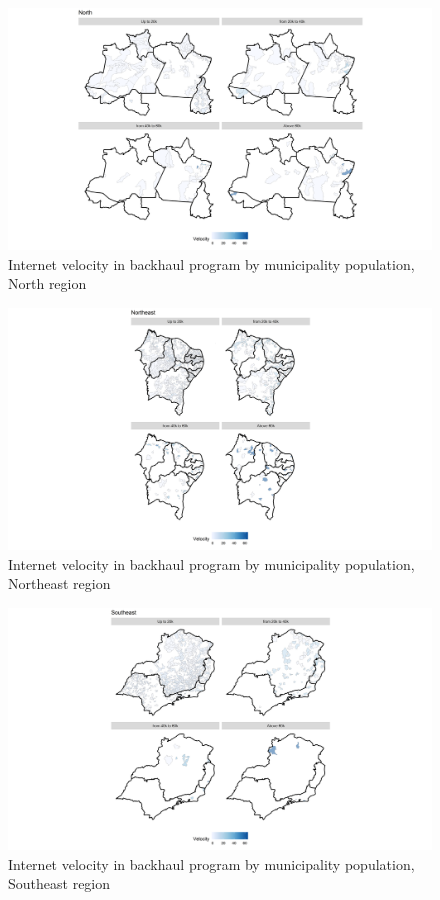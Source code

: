 \documentclass[12pt,]{article}
\begin{document}
\begin{figure}
\centering
\includegraphics{artigo1_files/figure-latex/mapa-1.png}
\caption{Internet velocity in backhaul program by municipality
population, North region \label{fig:1}}
\end{figure}

\begin{figure}
\centering
\includegraphics{artigo1_files/figure-latex/mapa2-1.png}
\caption{Internet velocity in backhaul program by municipality
population, Northeast region \label{fig:1.2}}
\end{figure}

\begin{figure}
\centering
\includegraphics{artigo1_files/figure-latex/mapa3-1.png}
\caption{Internet velocity in backhaul program by municipality
population, Southeast region \label{fig:1.3}}
\end{figure}
\end{document}
